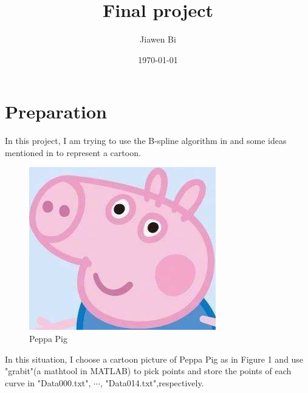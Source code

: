 \documentclass[]{article}
\title{Final project}
\author{Jiawen Bi}
\date{\today}
\begin{document}
\maketitle


\section{Preparation}
In this project, I am trying to use the B-spline algorithm in \cite{numana} and some ideas mentioned in \cite{zhang2019fluid} to represent a cartoon.
\par
\begin{figure}[ht]
	\centering
	\includegraphics[scale = 0.8]{fig.jpg}
	\caption{Peppa Pig}
	\label{fig:fig}
\end{figure}
In this situation, I choose a cartoon picture of Peppa Pig as in Figure 1
and use "grabit"(a mathtool in MATLAB) to pick points and store the points of each curve in "Data000.txt", $\cdots$, "Data014.txt",respectively.\par



\end{document}
